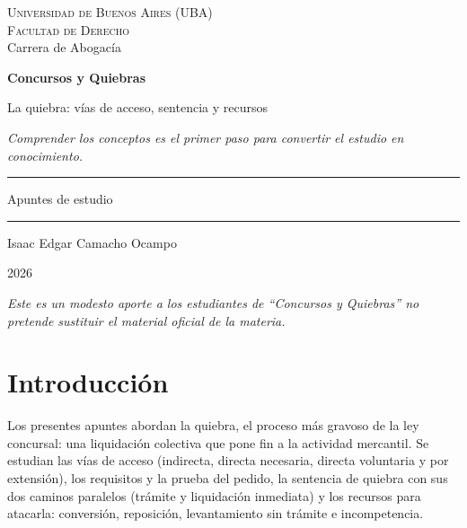 \documentclass[12pt,oneside]{book}
\newcommand{\universidad}{Universidad de Buenos Aires (UBA)}
\newcommand{\facultad}{Facultad de Derecho}
\newcommand{\carrera}{Carrera de Abogacía}
\newcommand{\materia}{Concursos y Quiebras}
\newcommand{\titulo}{La quiebra: vías de acceso, sentencia y recursos}
\newcommand{\autor}{Isaac Edgar Camacho Ocampo}
\newcommand{\anio}{2026}
\begin{document}
\begin{titlepage}
\thispagestyle{empty}
\begin{center}
\vspace*{1cm}
{\large \textsc{\universidad}}\\[0.2cm]
{\large \textsc{\facultad}}\\[0.2cm]
{\large \carrera}

\vspace{3cm}
{\Huge \textbf{\materia}}

\vspace{1cm}
{\LARGE \titulo}

\vspace{0.8cm}
\textit{Comprender los conceptos es el primer paso para convertir el estudio en conocimiento.}

\vspace{1.2cm}
\rule{0.70\textwidth}{0.5pt}

\vspace{0.5cm}
{\large Apuntes de estudio}

\vspace{0.5cm}
\rule{0.70\textwidth}{0.5pt}

\vfill
{\large \autor}

\vspace{0.3cm}
{\large \anio}
\end{center}
\vfill
\begin{flushleft}
\textit{Este es un modesto aporte a los estudiantes de ``\materia'' no pretende sustituir el material oficial de la materia.}
\end{flushleft}
\end{titlepage}

\tableofcontents

\chapter*{Introducción}

Los presentes apuntes abordan la quiebra, el proceso más gravoso de la ley concursal: una liquidación colectiva que pone fin a la actividad mercantil. Se estudian las vías de acceso (indirecta, directa necesaria, directa voluntaria y por extensión), los requisitos y la prueba del pedido, la sentencia de quiebra con sus dos caminos paralelos (trámite y liquidación inmediata) y los recursos para atacarla: conversión, reposición, levantamiento sin trámite e incompetencia.
\end{document}
